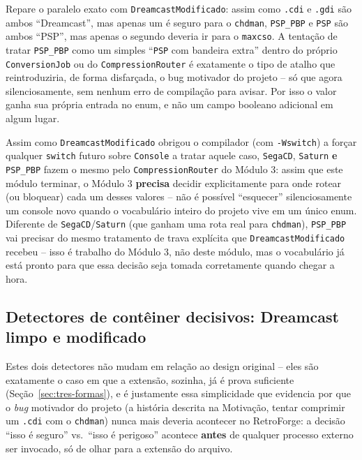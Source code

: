 \begin{CaixaAlerta}
Repare o paralelo exato com \texttt{DreamcastModificado}: assim como \texttt{.cdi} e \texttt{.gdi} são ambos ``Dreamcast'', mas apenas um é seguro para o \texttt{chdman}, \texttt{PSP\_PBP} e \texttt{PSP} são ambos ``PSP'', mas apenas o segundo deveria ir para o \texttt{maxcso}. A tentação de tratar \texttt{PSP\_PBP} como um simples ``\texttt{PSP} com bandeira extra'' dentro do próprio \texttt{ConversionJob} ou do \texttt{CompressionRouter} é exatamente o tipo de atalho que reintroduziria, de forma disfarçada, o bug motivador do projeto -- só que agora silenciosamente, sem nenhum erro de compilação para avisar. Por isso o valor ganha sua própria entrada no enum, e não um campo booleano adicional em algum lugar.
\end{CaixaAlerta}

\begin{CaixaInfo}
Assim como \texttt{DreamcastModificado} obrigou o compilador (com \texttt{-Wswitch}) a forçar qualquer \texttt{switch} futuro sobre \texttt{Console} a tratar aquele caso, \texttt{SegaCD}, \texttt{Saturn} \textbf{e} \texttt{PSP\_PBP} fazem o mesmo pelo \texttt{CompressionRouter} do Módulo 3: assim que este módulo terminar, o Módulo 3 \textbf{precisa} decidir explicitamente para onde rotear (ou bloquear) cada um desses valores -- não é possível ``esquecer'' silenciosamente um console novo quando o vocabulário inteiro do projeto vive em um único enum. Diferente de \texttt{SegaCD}/\texttt{Saturn} (que ganham uma rota real para \texttt{chdman}), \texttt{PSP\_PBP} vai precisar do mesmo tratamento de trava explícita que \texttt{DreamcastModificado} recebeu -- isso é trabalho do Módulo 3, não deste módulo, mas o vocabulário já está pronto para que essa decisão seja tomada corretamente quando chegar a hora.
\end{CaixaInfo}

\subsection{Detectores de contêiner decisivos: Dreamcast limpo e modificado}

Estes dois detectores não mudam em relação ao design original -- eles são exatamente o caso em que a extensão, sozinha, já é prova suficiente (Seção~\ref{sec:tres-formas}), e é justamente essa simplicidade que evidencia por que o \textit{bug} motivador do projeto (a história descrita na Motivação, tentar comprimir um \texttt{.cdi} com o \texttt{chdman}) nunca mais deveria acontecer no RetroForge: a decisão ``isso é seguro'' vs.\ ``isso é perigoso'' acontece \textbf{antes} de qualquer processo externo ser invocado, só de olhar para a extensão do arquivo.

